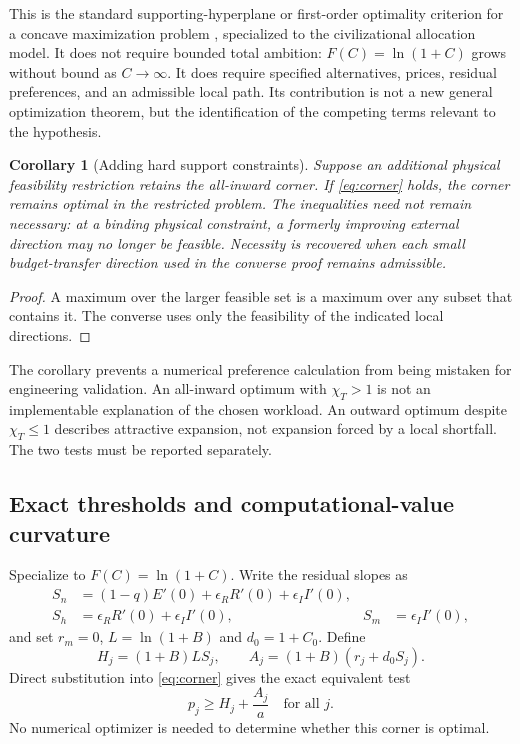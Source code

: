 \documentclass[11pt,a4paper]{article}
\newtheorem{corollary}[proposition]{Corollary}
\theoremstyle{definition}\newtheorem{definition}{Definition}
\begin{document}
This is the standard supporting-hyperplane or first-order optimality criterion for a concave maximization problem \citep[chapters 3--5]{BoydVandenberghe2004}, specialized to the civilizational allocation model. It does not require bounded total ambition: $F(C)=\ln(1+C)$ grows without bound as $C\to\infty$. It does require specified alternatives, prices, residual preferences, and an admissible local path. Its contribution is not a new general optimization theorem, but the identification of the competing terms relevant to the hypothesis.

\begin{corollary}[Adding hard support constraints]
\label{cor:feasibility}
Suppose an additional physical feasibility restriction retains the all-inward corner. If \cref{eq:corner} holds, the corner remains optimal in the restricted problem. The inequalities need not remain necessary: at a binding physical constraint, a formerly improving external direction may no longer be feasible. Necessity is recovered when each small budget-transfer direction used in the converse proof remains admissible.
\end{corollary}
\begin{proof}
A maximum over the larger feasible set is a maximum over any subset that contains it. The converse uses only the feasibility of the indicated local directions.
\end{proof}

The corollary prevents a numerical preference calculation from being mistaken for engineering validation. An all-inward optimum with $\chi_T>1$ is not an implementable explanation of the chosen workload. An outward optimum despite $\chi_T\leq1$ describes attractive expansion, not expansion forced by a local shortfall. The two tests must be reported separately.

\subsection{Exact thresholds and computational-value curvature}
\label{sec:threshold}

Specialize to $F(C)=\ln(1+C)$. Write the residual slopes as
\begin{align}
 S_n&=(1-q)E'(0)+\epsilon_RR'(0)+\epsilon_II'(0),\nonumber\\
 S_h&=\epsilon_RR'(0)+\epsilon_II'(0),& S_m&=\epsilon_II'(0),
 \label{eq:slopes}
\end{align}
and set $r_m=0$, $L=\ln(1+B)$ and $d_0=1+C_0$. Define
\begin{equation}
 H_j=(1+B)L S_j,\qquad A_j=(1+B)(r_j+d_0S_j).
 \label{eq:HA}
\end{equation}
Direct substitution into \cref{eq:corner} gives the exact equivalent test
\begin{equation}
 \boxed{p_j\geq H_j+\frac{A_j}{a}\quad\text{for all }j.}
 \label{eq:exact}
\end{equation}
No numerical optimizer is needed to determine whether this corner is optimal.
\end{document}
